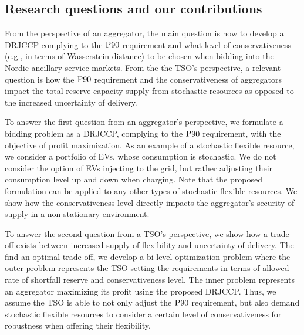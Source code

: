 \documentclass[conference]{IEEEtran}
\begin{document}
\subsection{Research questions and our contributions}
\vspace{-1mm}
From the perspective of an aggregator, the main question is how to develop a DRJCCP complying to the $\rm{P90}$ requirement and what level of conservativeness (e.g., in terms of Wasserstein distance) to be chosen when bidding into the Nordic ancillary service markets. From the the \ac{TSO}'s perspective, a relevant question is 
how the $\rm{P90}$ requirement and the conservativeness of aggregators impact the total reserve capacity supply from stochastic resources as opposed to the increased uncertainty of delivery. %

To answer the first question from an aggregator's perspective, we formulate a bidding problem as a \ac{DRJCCP}, complying to the $\rm{P90}$ requirement, with the objective of profit maximization.  
As an example of a stochastic flexible resource, we consider a portfolio of \acp{EV}, whose consumption  is stochastic. We do not consider the option of EVs injecting to the grid, but rather adjusting their consumption level up and down when charging. 
Note that the proposed formulation can be applied to any other types of stochastic flexible resources. 
We show how the conservativeness level directly impacts the aggregator's security of supply in a non-stationary environment.

To answer the second question from a TSO's perspective, we show how a trade-off exists between increased supply of flexibility  and uncertainty of delivery. The find an optimal trade-off, we develop a bi-level optimization problem where the outer problem represents the \ac{TSO} setting the requirements in terms of allowed rate of shortfall reserve and conservativeness level. The inner problem represents an aggregator maximizing its profit using the proposed \ac{DRJCCP}. Thus, we assume the \ac{TSO} is able to not only adjust the $\rm{P90}$ requirement, but also demand stochastic flexible resources to consider a  certain level of conservativeness for robustness when offering their flexibility.
\end{document}
